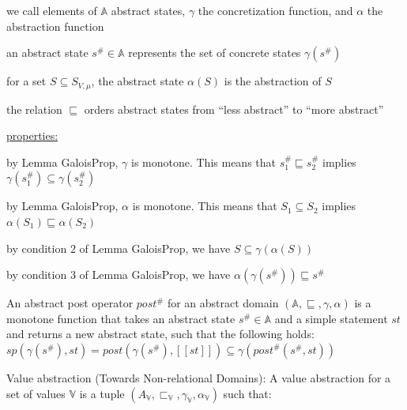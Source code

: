 \documentclass[landscape, a4paper]{article}
\begin{document}
\begin{minipage}[t]{0.2\linewidth}
\begin{betterlist}
\begin{betterlist}
\begin{betterlist}
				\item we call elements of $\mathbb{A}$ \alert{abstract states}, $\gamma$ the \alert{concretization function}, and $\alpha$ the \alert{abstraction function}
				\item an abstract state $s^\# \in \mathbb{A}$ represents the set of concrete states $\gamma(s^\#)$
				\item for a set $S \subseteq S_{V,\mu}$, the abstract state $\alpha(S)$ is the abstraction of $S$
				\item the relation $\sqsubseteq$ orders abstract states from \enquote{less abstract} to \enquote{more abstract}
				\item \underline{properties:}
				\begin{betterlist}
					\item by Lemma GaloisProp, $\gamma$ is monotone. This means that $s^\#_1 \sqsubseteq s^\#_2$ implies $\gamma(s^\#_1) \subseteq \gamma(s^\#_2)$
					\item by Lemma GaloisProp, $\alpha$ is monotone. This means that $S_1 \subseteq S_2$ implies $\alpha(S_1) \sqsubseteq \alpha(S_2)$
					\item by condition $2$ of Lemma GaloisProp, we have $S \subseteq \gamma(\alpha(S))$
					\item by condition $3$ of Lemma GaloisProp, we have $\alpha(\gamma(s^\#)) \sqsubseteq s^\#$
				\end{betterlist}
      \end{betterlist}
			\item {}
		\end{betterlist}\color{black} 
  \item \color{violet}An \alert{abstract post operator} $post^\#$ for an abstract domain $(\mathbb{A}, \sqsubseteq, \gamma, \alpha)$ is a monotone function that takes an abstract state $s^\# \in \mathbb{A}$ and a simple statement $st$ and returns a new abstract state, such that the following holds: $sp(\gamma(s^\#), st) = post(\gamma(s^\#), [[st]]) \subseteq \gamma(post^\#(s^\#, st))$\color{black}
		\begin{betterlist}
			\item {}
			\item {}
		\end{betterlist}
  \item \color{orange}\alert{Value abstraction (Towards Non-relational Domains):} A value abstraction for a set of values $\mathbb{V}$ is a tuple $(A_{\mathbb{V}}, \sqsubset_{\mathbb{V}}, \gamma_{\mathbb{V}}, \alpha_{\mathbb{V}})$ such that:

\end{betterlist}
\end{minipage}
\end{document}
